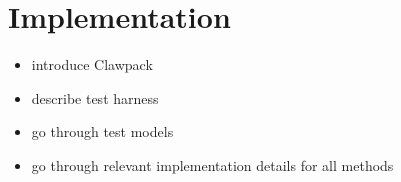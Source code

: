 \chapter{Implementation}
\label{ch:implementation}

\begin{itemize}
  \item introduce Clawpack
  \item describe test harness
  \item go through test models
  \item go through relevant implementation details for all methods
\end{itemize}